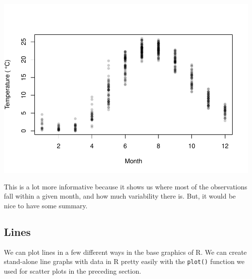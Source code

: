 \documentclass[
]{book}
\newenvironment{Shaded}{\begin{snugshade}}{\end{snugshade}}
\newcommand{\CommentTok}[1]{\textcolor[rgb]{0.56,0.35,0.01}{\textit{#1}}}
\newcommand{\DataTypeTok}[1]{\textcolor[rgb]{0.13,0.29,0.53}{#1}}
\newcommand{\DecValTok}[1]{\textcolor[rgb]{0.00,0.00,0.81}{#1}}
\newcommand{\FloatTok}[1]{\textcolor[rgb]{0.00,0.00,0.81}{#1}}
\newcommand{\KeywordTok}[1]{\textcolor[rgb]{0.13,0.29,0.53}{\textbf{#1}}}
\newcommand{\NormalTok}[1]{#1}
\newcommand{\OperatorTok}[1]{\textcolor[rgb]{0.81,0.36,0.00}{\textbf{#1}}}
\newcommand{\OtherTok}[1]{\textcolor[rgb]{0.56,0.35,0.01}{#1}}
\newcommand{\StringTok}[1]{\textcolor[rgb]{0.31,0.60,0.02}{#1}}
\begin{document}
\begin{Shaded}
\end{Shaded}

\includegraphics{worstr_files/figure-latex/unnamed-chunk-93-1.pdf}

This is a lot more informative because it shows us where most of the observations fall within a given month, and how much variability there is. But, it would be nice to have some summary.

\hypertarget{lines}{%
\subsection{Lines}\label{lines}}

We can plot lines in a few different ways in the base graphics of R. We can create stand-alone line graphs with data in R pretty easily with the \texttt{plot()} function we used for scatter plots in the preceding section.
\end{document}
